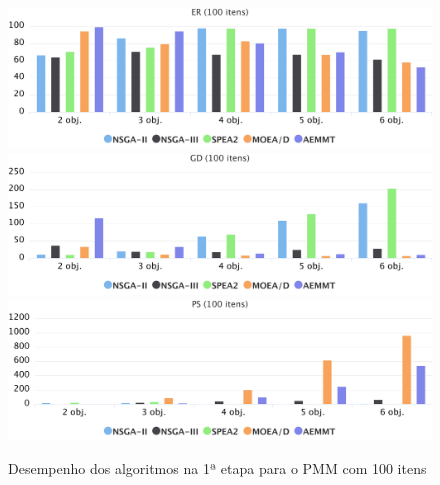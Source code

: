 \begin{figure}[!htbp]
	\includegraphics[width=1\textwidth]{cap_experimentos/figs/etapa1/er-mkp-100}
	\includegraphics[width=1\textwidth]{cap_experimentos/figs/etapa1/gd-mkp-100}
	\includegraphics[width=1\textwidth]{cap_experimentos/figs/etapa1/ps-mkp-100}
	\caption{\label{fig_exp1_pmm_100}Desempenho dos algoritmos na 1ª etapa para o PMM com 100 itens}
\end{figure}

